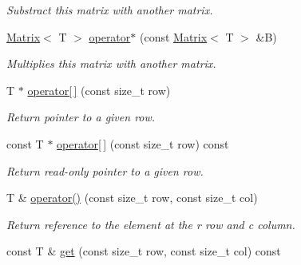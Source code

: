 \begin{DoxyCompactItemize}
\begin{DoxyCompactList}\small\item\em Substract this matrix with another matrix. \end{DoxyCompactList}\item 
\hyperlink{classanpi_1_1Matrix}{Matrix}$<$ T $>$ \hyperlink{classanpi_1_1Matrix_a46d50949da215dafdb2d13e3ae4c9ac3}{operator$\ast$} (const \hyperlink{classanpi_1_1Matrix}{Matrix}$<$ T $>$ \&B)\hypertarget{classanpi_1_1Matrix_a46d50949da215dafdb2d13e3ae4c9ac3}{}\label{classanpi_1_1Matrix_a46d50949da215dafdb2d13e3ae4c9ac3}

\begin{DoxyCompactList}\small\item\em Multiplies this matrix with another matrix. \end{DoxyCompactList}\item 
T $\ast$ \hyperlink{classanpi_1_1Matrix_a6bcaaad80bd2d631017472231f6d5e63}{operator\mbox{[}$\,$\mbox{]}} (const size\+\_\+t row)\hypertarget{classanpi_1_1Matrix_a6bcaaad80bd2d631017472231f6d5e63}{}\label{classanpi_1_1Matrix_a6bcaaad80bd2d631017472231f6d5e63}

\begin{DoxyCompactList}\small\item\em Return pointer to a given row. \end{DoxyCompactList}\item 
const T $\ast$ \hyperlink{classanpi_1_1Matrix_a13da6bd67304aac627c88f7213d5593c}{operator\mbox{[}$\,$\mbox{]}} (const size\+\_\+t row) const \hypertarget{classanpi_1_1Matrix_a13da6bd67304aac627c88f7213d5593c}{}\label{classanpi_1_1Matrix_a13da6bd67304aac627c88f7213d5593c}

\begin{DoxyCompactList}\small\item\em Return read-\/only pointer to a given row. \end{DoxyCompactList}\item 
T \& \hyperlink{classanpi_1_1Matrix_aefaff4b28c12084a0c268573e96cf9ca}{operator()} (const size\+\_\+t row, const size\+\_\+t col)\hypertarget{classanpi_1_1Matrix_aefaff4b28c12084a0c268573e96cf9ca}{}\label{classanpi_1_1Matrix_aefaff4b28c12084a0c268573e96cf9ca}

\begin{DoxyCompactList}\small\item\em Return reference to the element at the r row and c column. \end{DoxyCompactList}\item 
const T \& \hyperlink{classanpi_1_1Matrix_aedfd2cc5d14302bac723cafc08cc026a}{get} (const size\+\_\+t row, const size\+\_\+t col) const \hypertarget{classanpi_1_1Matrix_aedfd2cc5d14302bac723cafc08cc026a}{}\label{classanpi_1_1Matrix_aedfd2cc5d14302bac723cafc08cc026a}


\end{DoxyCompactItemize}
